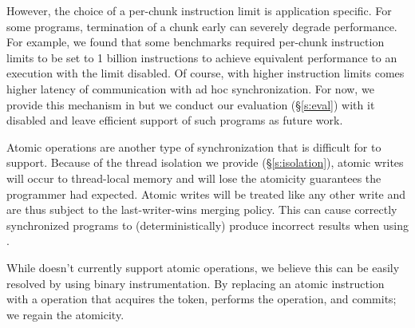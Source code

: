 However, the choice of a per-chunk instruction limit is application specific. For some programs, termination of a chunk early can severely degrade performance. For example, we found that some benchmarks required per-chunk instruction limits to be set to 1 billion instructions to achieve equivalent performance to an execution with the limit disabled. Of course, with higher instruction limits comes higher latency of communication with ad hoc synchronization. For now, we provide this mechanism in \lib{} but we conduct our evaluation (\S\ref{s:eval}) with it disabled and leave efficient support of such programs as future work.

Atomic operations are another type of synchronization that is difficult for \lib{} to support. Because of the thread isolation we provide (\S\ref{s:isolation}), atomic writes will occur to thread-local memory and will lose the atomicity guarantees the programmer had expected. Atomic writes will be treated like any other write and are thus subject to the last-writer-wins merging policy. This can cause correctly synchronized programs to (deterministically) produce incorrect results when using \lib{}.

While \lib{} doesn't currently support atomic operations, we believe this can be easily resolved by using binary instrumentation. By replacing an atomic instruction with a \lib{} operation that acquires the token, performs the operation, and commits; we regain the atomicity.
%


%



